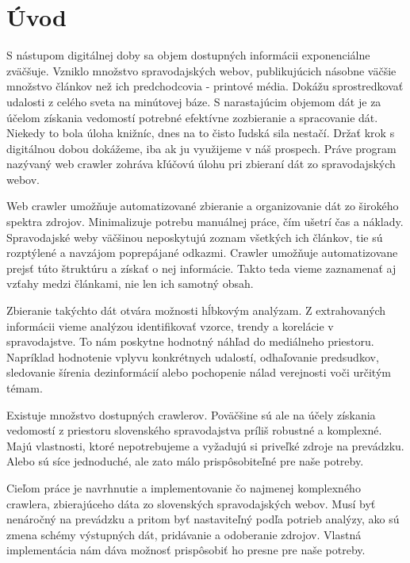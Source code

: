 
{}

\chapter*{Úvod}

S nástupom digitálnej doby sa objem dostupných informácii exponenciálne zväčšuje. Vzniklo množstvo spravodajských webov, publikujúcich násobne väčšie množstvo článkov než ich predchodcovia - printové média. Dokážu sprostredkovať udalosti z celého sveta na minútovej báze. S narastajúcim objemom dát je za účelom získania vedomostí potrebné efektívne zozbieranie a spracovanie dát. Niekedy to bola úloha knižníc, dnes na to čisto ľudská sila nestačí. Držať krok s digitálnou dobou dokážeme, iba ak ju využijeme v náš prospech. Práve program nazývaný web crawler zohráva kľúčovú úlohu pri zbieraní dát zo spravodajských webov. 

Web crawler umožňuje automatizované zbieranie a organizovanie dát zo širokého spektra zdrojov. Minimalizuje potrebu manuálnej práce, čím ušetrí čas a náklady. Spravodajské weby väčšinou neposkytujú zoznam všetkých ich článkov, tie sú rozptýlené a navzájom poprepájané odkazmi. Crawler umožňuje automatizovane prejsť túto štruktúru a získať o nej informácie. Takto teda vieme zaznamenať aj vzťahy medzi článkami, nie len ich samotný obsah. 

Zbieranie takýchto dát otvára možnosti hĺbkovým analýzam. Z extrahovaných informácii vieme analýzou identifikovať vzorce, trendy a korelácie v spravodajstve. To nám poskytne hodnotný náhľad do mediálneho priestoru. Napríklad hodnotenie vplyvu konkrétnych udalostí, odhaľovanie predsudkov, sledovanie šírenia dezinformácií alebo pochopenie nálad verejnosti voči určitým témam. 

Existuje množstvo dostupných crawlerov. Poväčšine sú ale na účely získania vedomostí z priestoru slovenského spravodajstva príliš robustné a komplexné. Majú vlastnosti, ktoré nepotrebujeme a vyžadujú si priveľké zdroje na prevádzku. Alebo sú síce jednoduché, ale zato málo prispôsobiteľné pre naše potreby. 

Cieľom práce je navrhnutie a implementovanie čo najmenej komplexného crawlera, zbierajúceho dáta zo slovenských spravodajských webov. Musí byť nenáročný na prevádzku a pritom byť nastaviteľný podľa potrieb analýzy, ako sú zmena schémy výstupných dát, pridávanie a odoberanie zdrojov. Vlastná implementácia nám dáva možnosť prispôsobiť ho presne pre naše potreby.


